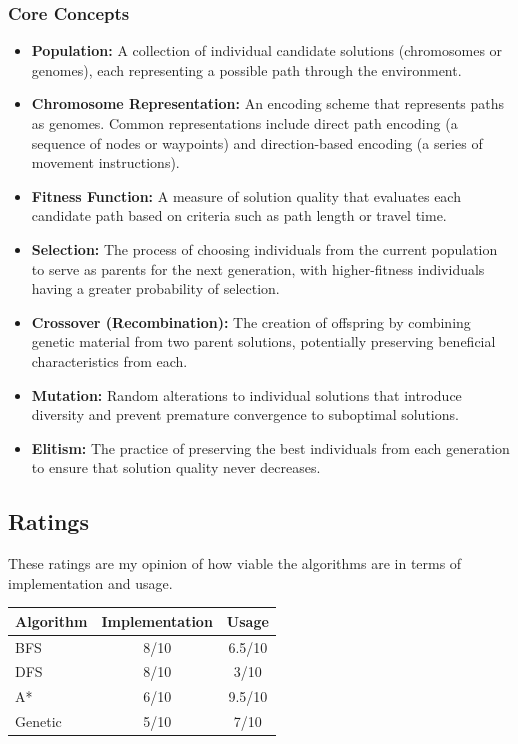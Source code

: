 \newpage

\subsubsection{Core Concepts}
\begin{itemize}
    \item \textbf{Population:} A collection of individual candidate solutions (chromosomes or genomes), each representing a possible path through the environment.
    
    \item \textbf{Chromosome Representation:} An encoding scheme that represents paths as genomes. Common representations include direct path encoding (a sequence of nodes or waypoints) and direction-based encoding (a series of movement instructions).

    
    \item \textbf{Fitness Function:} A measure of solution quality that evaluates each candidate path based on criteria such as path length or travel time.    
    \item \textbf{Selection:} The process of choosing individuals from the current population to serve as parents for the next generation, with higher-fitness individuals having a greater probability of selection.
    
    \item \textbf{Crossover (Recombination):} The creation of offspring by combining genetic material from two parent solutions, potentially preserving beneficial characteristics from each.
    
    \item \textbf{Mutation:} Random alterations to individual solutions that introduce diversity and prevent premature convergence to suboptimal solutions.
    
    \item \textbf{Elitism:} The practice of preserving the best individuals from each generation to ensure that solution quality never decreases.
\end{itemize}

\subsection{Ratings}
These ratings are my opinion of how viable the algorithms are in terms of implementation and usage. \cite{badrelkari_2024_exploring}

\begin{table}[htbp!]
\centering
\begin{tabular}{|l|c|c|}
\hline
\textbf{Algorithm} & \textbf{Implementation} & \textbf{Usage} \\
\hline
BFS & 8/10 & 6.5/10 \\
\hline
DFS & 8/10 & 3/10 \\
\hline
A* & 6/10 & 9.5/10 \\
\hline
Genetic & 5/10 & 7/10 \\
\hline
\end{tabular}
\end{table}

